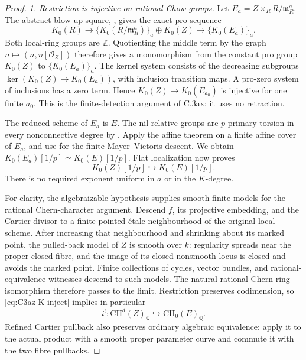 \begin{proof}
\emph{1. Restriction is injective on rational Chow groups.}
Let $E_a=Z\times_R R/\mathfrak m_R^a$. The abstract blow-up square,
\citet[Theorem A and equation (1.6), author pp.~2--3]
{rootKerzStrunkTamme2018}, gives the exact pro sequence
\[
 K_0(R)\longrightarrow
 \{K_0(R/\mathfrak m_R^a)\}_a\oplus K_0(Z)
 \longrightarrow\{K_0(E_a)\}_a.
\]
Both local-ring groups are $\mathbb Z$. Quotienting the middle
term by the graph $n\mapsto(n,n[\mathcal O_Z])$ therefore gives
a monomorphism from the constant pro group $K_0(Z)$ to
$\{K_0(E_a)\}_a$. The kernel system consists of the decreasing
subgroups $\ker(K_0(Z)\to K_0(E_a))$, with inclusion transition
maps. A pro-zero system of inclusions has a zero term. Hence
$K_0(Z)\to K_0(E_{a_0})$ is injective for one finite $a_0$.
This is the finite-detection argument of C.3ax; it uses no retraction.

The reduced scheme of $E_a$ is $E$. The nil-relative groups are
$p$-primary torsion in every nonconnective degree by
\citet[Theorem A, p.~29]{rootGeisserHesselholt2011}.
Apply the affine theorem on a finite affine cover of $E_a$, and use
\citet[Theorem 8.1, p.~367]{D_ThomasonTrobaugh1990} for the finite
Mayer--Vietoris descent. We obtain
$K_0(E_a)[1/p]\simeq K_0(E)[1/p]$. Flat localization now proves
\begin{equation}\label{eq:C3az-K-inject}
                         K_0(Z)[1/p]\hookrightarrow K_0(E)[1/p].
\end{equation}
There is no required exponent uniform in $a$ or in the $K$-degree.

For clarity, the algebraizable hypothesis supplies smooth finite
models for the rational Chern-character argument. Descend $f$, its
projective embedding, and the Cartier divisor to a finite
pointed-\'etale neighbourhood of the original local scheme. After
increasing that neighbourhood and shrinking about its marked point,
the pulled-back model of $Z$ is smooth over $k$: regularity spreads
near the proper closed fibre, and the image of its closed nonsmooth
locus is closed and avoids the marked point. Finite collections of
cycles, vector bundles, and rational-equivalence witnesses descend
to such models. The natural rational Chern ring isomorphism
\citep[Example 15.2.16(b), pp.~294--295]{frC4Fulton1998}
therefore passes to the limit. Restriction preserves codimension,
so \eqref{eq:C3az-K-inject} implies in particular
\begin{equation}\label{eq:C3az-Chow-inject}
                  i^!: \mathrm{CH}^d(Z)_{\mathbb Q}
                       \hookrightarrow\mathrm{CH}_0(E)_{\mathbb Q}.
\end{equation}
Refined Cartier pullback also preserves ordinary algebraic
equivalence: apply it to the actual product with a smooth proper
parameter curve and commute it with the two fibre pullbacks.


\end{proof}

